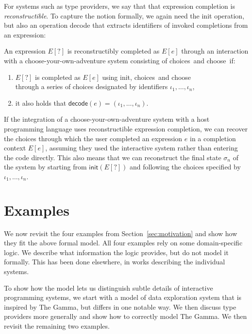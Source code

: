 \documentclass[a4paper,UKenglish,cleveref, autoref, thm-restate]{lipics-v2021}
\newcommand{\ident}[1]{\textsf{#1}}
\newcommand{\select}{\textnormal{\ident{choose}}}
\newcommand{\choices}{\textnormal{\ident{choices}}}
\begin{document}
For systems such as type providers, we say that that expression completion is \emph{reconstructible}.
To capture the notion formally, we again need the \ident{init} operation, but also an operation
\ident{decode} that extracts identifiers of invoked completions from an expression:

\begin{definition}
An expression $E[?]$ is reconstructibly completed as $E[e]$ through an interaction with
a choose-your-own-adventure system consisting of \choices\ and \select\ if:

\vspace{-0.5em}
\raggedright
\begin{enumerate}
\item $E[?]$ is completed as $E[e]$ using \ident{init}, \choices\ and \select\\
  through a series of choices designated by identifiers $\iota_1, \ldots, \iota_n$,
\item it also holds that $\ident{decode}(e)=(\iota_1, \ldots, \iota_n)$.
\end{enumerate}
\end{definition}

If the integration of a choose-your-own-adventure system with a host programming language
uses reconstructible expression completion, we can recover the choices through which the user completed
an expression $e$ in a completion context $E[e]$, assuming they used the interactive system rather
than entering the code directly. This also means that we can reconstruct the final state $\sigma_n$
of the system by starting from $\ident{init}(E[?])$ and following the choices specified by
$\iota_1, \ldots, \iota_n$.

\newpage
\section{Examples}
\label{sec:examples}

We now revisit the four examples from Section~\ref{sec:motivation} and show how they fit the
above formal model. All four examples rely on some domain-specific logic. We describe what
information the logic provides, but do not model it formally. This has been done elsewhere,
in works describing the individual systems.

To show how the model lets us distinguish subtle details of interactive programming systems,
we start with a model of data exploration system that is inspired by The Gamma, but differs in
one notable way. We then discuss type providers more generally and show how to correctly model
The Gamma. We then revisit the remaining two examples.
\end{document}
